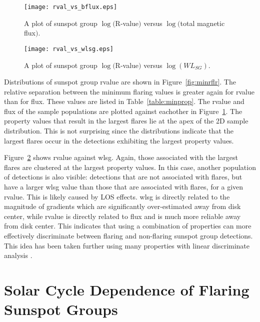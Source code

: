 {\begin{figure}[!t]
\centerline{\texttt{[image: rval\_vs\_bflux.eps]}}
\caption[AR R-value versus flux.]{A plot of sunspot group $\log($R-value$)$ versus $\log($total magnetic flux$)$.}
\label{fig:flxvsrval}
\end{figure}

\begin{figure}[!t]
\centerline{\texttt{[image: rval\_vs\_wlsg.eps]}}
\caption[AR R-value versus $WL_{SG}$.]{A plot of sunspot group $\log($R-value$)$ versus $\log(WL_{SG})$.}
\label{fig:rvswlsg}
\end{figure}

Distributions of sunspot group \gls{rvalue} are shown in Figure~\ref{fig:minrflr}. The relative separation between the minimum flaring values is greater again for \gls{rvalue} than for flux. These values are listed in Table~\ref{table:minprop}. The \gls{rvalue} and flux of the sample populations are plotted against eachother in Figure~\ref{fig:flxvsrval}. The property values that result in the largest flares lie at the apex of the 2D sample distribution. This is not surprising since the distributions indicate that the largest flares occur in the detections exhibiting the largest property values.

Figure~\ref{fig:rvswlsg} shows \gls{rvalue} against \gls{wlsg}. Again, those associated with the largest flares are clustered at the largest property values. In this case, another population of detections is also visible: detections that are not associated with flares, but have a larger \gls{wlsg} value than those that are associated with flares, for a given \gls{rvalue}. This is likely caused by \gls{LOS} effects. \gls{wlsg} is directly related to the magnitude of gradients which are significantly over-estimated away from disk center, while \gls{rvalue} is directly related to flux and is much more reliable away from disk center. This indicates that using a combination of properties can more effectively discriminate between flaring and non-flaring sunspot group detections. This idea has been taken further using many properties with linear discriminate analysis \citep{Leka:2003a,Leka:2003b}. 


\section{Solar Cycle Dependence of Flaring Sunspot Groups}\label{sect:solcycflr}

}
